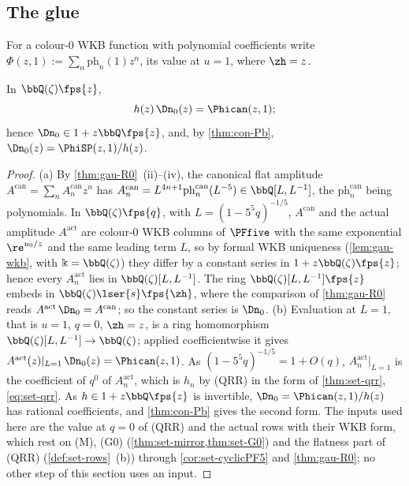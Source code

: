 
\subsection{The glue}
\label{sec:con-glue}

For a colour-$0$ WKB function with polynomial coefficients write $\Phi(z,1):=\sum_n\mathrm{ph}_n(1)z^n$, its value at $u=1$, where $\zh=z$.

\begin{thm}
\label{thm:con-glue}
In $\bbQ(\zeta)\fps{z}$,
\begin{equation}
\label{eq:con-glue}
h(z)\,\Dn_0(z)=\Phican(z,1);
\end{equation}
hence $\Dn_0\in1+z\bbQ\fps{z}$, and, by \cref{thm:con-Pb}, $\Dn_0(z)=\PhiSP(z,1)/h(z)$.
\end{thm}

\begin{proof}
(a) By \cref{thm:gau-R0}~(ii)--(iv), the canonical flat amplitude $A^{\mathrm{can}}=\sum_nA^{\mathrm{can}}_nz^n$ has $A^{\mathrm{can}}_n=L^{4n+1}\mathrm{ph}^{\mathrm{can}}_n(L^{-5})\in\bbQ[L,L^{-1}]$, the $\mathrm{ph}^{\mathrm{can}}_n$ being polynomials. In $\bbQ(\zeta)\fps{q}$, with $L=(1-5^5q)^{-1/5}$, $A^{\mathrm{can}}$ and the actual amplitude $A^{\mathrm{act}}$ are colour-$0$ WKB columns of $\PFfive$ with the same exponential $\re^{u_0/z}$ and the same leading term $L$, so by formal WKB uniqueness (\cref{lem:gau-wkb}, with $\Bbbk=\bbQ(\zeta)$) they differ by a constant series in $1+z\bbQ(\zeta)\fps{z}$; hence every $A^{\mathrm{act}}_n$ lies in $\bbQ(\zeta)[L,L^{-1}]$. The ring $\bbQ(\zeta)[L,L^{-1}]\fps{z}$ embeds in $\bbQ(\zeta)\lser{s}\fps{\zh}$, where the comparison of \cref{thm:gau-R0} reads $A^{\mathrm{act}}\,\Dn_0=A^{\mathrm{can}}$; so the constant series is $\Dn_0$. (b) Evaluation at $L=1$, that is $u=1$, $q=0$, $\zh=z$, is a ring homomorphism $\bbQ(\zeta)[L,L^{-1}]\to\bbQ(\zeta)$; applied coefficientwise it gives $A^{\mathrm{act}}(z)|_{L=1}\,\Dn_0(z)=\Phican(z,1)$. As $(1-5^5q)^{-1/5}=1+O(q)$, $A^{\mathrm{act}}_n|_{L=1}$ is the coefficient of $q^0$ of $A^{\mathrm{act}}_n$, which is $h_n$ by (QRR) in the form of \cref{thm:set-qrr}, \eqref{eq:set-qrr}. As $h\in1+z\bbQ\fps{z}$ is invertible, $\Dn_0=\Phican(z,1)/h(z)$ has rational coefficients, and \cref{thm:con-Pb} gives the second form. The inputs used here are the value at $q=0$ of (QRR) and the actual rows with their WKB form, which rest on (M), (G0) (\cref{thm:set-mirror,thm:set-G0}) and the flatness part of (QRR) (\cref{def:set-rows}~(b)) through \cref{cor:set-cyclicPF5} and \cref{thm:gau-R0}; no other step of this section uses an input.
\end{proof}

